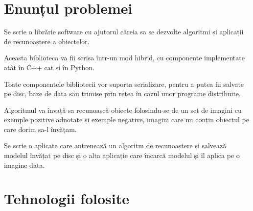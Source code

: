 















\section{Enunțul problemei}
Se scrie o librărie software cu ajutorul căreia sa se dezvolte algoritmi și aplicații de recunoaștere a obiectelor.

Aceasta biblioteca va fii scrisa într-un mod hibrid, cu componente implementate atât în C++ cat și în Python.

Toate componentele bibliotecii vor suporta serializare, pentru a putea fii salvate pe disc, baze de data sau trimise prin rețea în cazul unor programe distribuite.

Algoritmul va învață sa recunoască obiecte folosindu-se de un set de imagini cu exemple pozitive adnotate și exemple negative, imagini care nu conțin obiectul pe care dorim sa-l învățam.

Se scrie o aplicate care antrenează un algoritm de recunoaștere și salvează modelul învățat pe disc și o alta aplicație care încarcă modelul și îl aplica pe o imagine data.

\pagebreak
\section{Tehnologii folosite}

